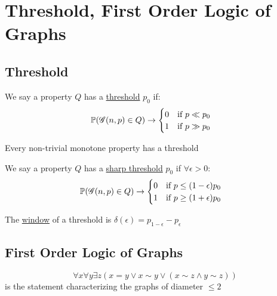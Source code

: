 \section{Threshold, First Order Logic of Graphs}

\subsection{Threshold}
\begin{definition}
    We say a property $Q$ has a \ul{threshold} $p_0$ if:
    \begin{equation*}
        \operatorname{\mathbb{P}}(\operatorname{\mathscr{G}}(n, p) \in Q) \rightarrow 
        \begin{cases}
            0 \quad \text{if $p \ll p_0$} \\
            1 \quad \text{if $p \gg p_0$}    
        \end{cases}
    \end{equation*}
\end{definition}

\begin{theorem}
    Every non-trivial monotone property has a threshold
\end{theorem}

\begin{definition}
    We say a property $Q$ has a \ul{sharp threshold} $p_0$ if $\forall \epsilon > 0$:
    \begin{equation*}
        \operatorname{\mathbb{P}}(\operatorname{\mathscr{G}}(n, p) \in Q) \rightarrow 
        \begin{cases}
            0 \quad \text{if $p \leq (1 - \epsilon)p_0$} \\
            1 \quad \text{if $p \geq (1 + \epsilon)p_0$}    
        \end{cases}
    \end{equation*}
\end{definition}

\begin{definition}
    The \ul{window} of a threshold is $\delta(\epsilon) = p_{1 - \epsilon} - p_{\epsilon}$
\end{definition}

\subsection{First Order Logic of Graphs}
\begin{example}
    \begin{equation*}
        \forall x \forall y \exists z \left(x = y \vee x \sim y \vee \left(x \sim z \wedge y \sim z\right)\right)
    \end{equation*}
    is the statement characterizing the graphs of diameter $\leq 2$
\end{example}

